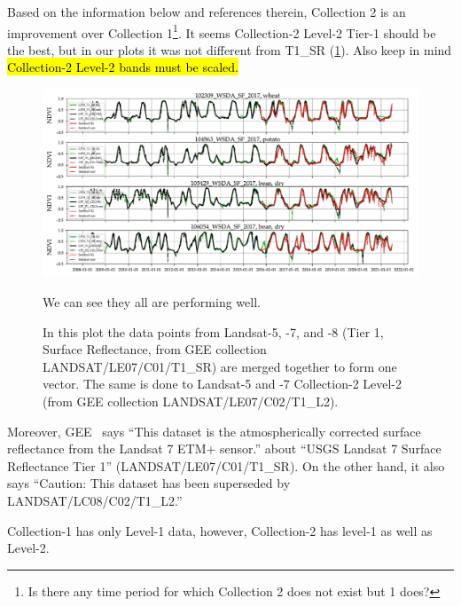 \documentclass{article}
\begin{document}
Based on the information below and references therein, Collection 2 is an improvement
over Collection 1\footnote{Is there any time period for which Collection 2 
does not exist but 1 does?}.
It seems Collection-2 Level-2 Tier-1 should be the best, but
in our plots it was not different from T1\_SR (\cref{fig:C2L2Performance}). 
Also keep in mind \hl{Collection-2 Level-2 bands must be scaled.}

\begin{figure}[H]
  \includegraphics[width=1\textwidth]{figures/00_merged_Landsats_Smoothed_and_raw}
\caption{In this plot the data points from Landsat-5, -7, and -8 (Tier 1, Surface Reflectance, from GEE collection LANDSAT/LE07/C01/T1\_SR) are
merged together to form one vector. The same is done to Landsat-5 and -7 Collection-2 Level-2 (from GEE collection LANDSAT/LE07/C02/T1\_L2).}
We can see they all are performing well.
\label{fig:C2L2Performance}
\end{figure}


Moreover, GEE~\cite{Landsat7T1SRBandWidths}
says ``This dataset is the atmospherically corrected surface
reflectance from the Landsat 7 ETM+ sensor.'' about ``USGS Landsat 7 
Surface Reflectance Tier 1''  (LANDSAT/LE07/C01/T1\_SR). 
On the other hand, it also says ``Caution: 
This dataset has been superseded by LANDSAT/LC08/C02/T1\_L2.'' 

Collection-1 has only Level-1 data, however, Collection-2 has 
level-1 as well as Level-2.
\end{document}
